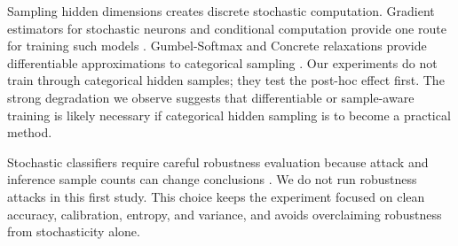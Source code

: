 Sampling hidden dimensions creates discrete stochastic computation. Gradient estimators for stochastic neurons and conditional computation provide one route for training such models \cite{bengio2013estimating}. Gumbel-Softmax and Concrete relaxations provide differentiable approximations to categorical sampling \cite{jang2017categorical,maddison2017concrete}. Our experiments do not train through categorical hidden samples; they test the post-hoc effect first. The strong degradation we observe suggests that differentiable or sample-aware training is likely necessary if categorical hidden sampling is to become a practical method.

Stochastic classifiers require careful robustness evaluation because attack and inference sample counts can change conclusions \cite{daubener2022sampling}. We do not run robustness attacks in this first study. This choice keeps the experiment focused on clean accuracy, calibration, entropy, and variance, and avoids overclaiming robustness from stochasticity alone.
